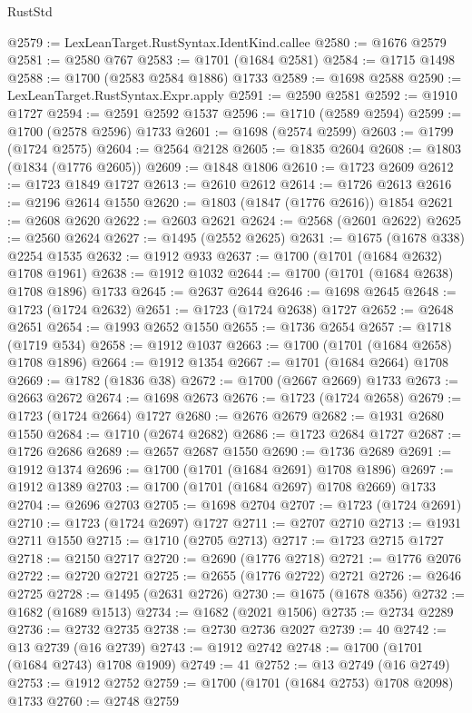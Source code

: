 \begin{lexlean}{RustStd}
\begin{coremodule}
@2579 := LexLeanTarget.RustSyntax.IdentKind.callee
@2580 := @1676 @2579
@2581 := @2580 @767
@2583 := @1701 (@1684 @2581)
@2584 := @1715 @1498
@2588 := @1700 (@2583 @2584 @1886) @1733
@2589 := @1698 @2588
@2590 := LexLeanTarget.RustSyntax.Expr.apply
@2591 := @2590 @2581
@2592 := @1910 @1727
@2594 := @2591 @2592 @1537
@2596 := @1710 (@2589 @2594)
@2599 := @1700 (@2578 @2596) @1733
@2601 := @1698 (@2574 @2599)
@2603 := @1799 (@1724 @2575)
@2604 := @2564 @2128
@2605 := @1835 @2604
@2608 := @1803 (@1834 (@1776 @2605))
@2609 := @1848 @1806
@2610 := @1723 @2609
@2612 := @1723 @1849 @1727
@2613 := @2610 @2612
@2614 := @1726 @2613
@2616 := @2196 @2614 @1550
@2620 := @1803 (@1847 (@1776 @2616)) @1854
@2621 := @2608 @2620
@2622 := @2603 @2621
@2624 := @2568 (@2601 @2622)
@2625 := @2560 @2624
@2627 := @1495 (@2552 @2625)
@2631 := @1675 (@1678 @338) @2254 @1535
@2632 := @1912 @933
@2637 := @1700 (@1701 (@1684 @2632) @1708 @1961)
@2638 := @1912 @1032
@2644 := @1700 (@1701 (@1684 @2638) @1708 @1896) @1733
@2645 := @2637 @2644
@2646 := @1698 @2645
@2648 := @1723 (@1724 @2632)
@2651 := @1723 (@1724 @2638) @1727
@2652 := @2648 @2651
@2654 := @1993 @2652 @1550
@2655 := @1736 @2654
@2657 := @1718 (@1719 @534)
@2658 := @1912 @1037
@2663 := @1700 (@1701 (@1684 @2658) @1708 @1896)
@2664 := @1912 @1354
@2667 := @1701 (@1684 @2664) @1708
@2669 := @1782 (@1836 @38)
@2672 := @1700 (@2667 @2669) @1733
@2673 := @2663 @2672
@2674 := @1698 @2673
@2676 := @1723 (@1724 @2658)
@2679 := @1723 (@1724 @2664) @1727
@2680 := @2676 @2679
@2682 := @1931 @2680 @1550
@2684 := @1710 (@2674 @2682)
@2686 := @1723 @2684 @1727
@2687 := @1726 @2686
@2689 := @2657 @2687 @1550
@2690 := @1736 @2689
@2691 := @1912 @1374
@2696 := @1700 (@1701 (@1684 @2691) @1708 @1896)
@2697 := @1912 @1389
@2703 := @1700 (@1701 (@1684 @2697) @1708 @2669) @1733
@2704 := @2696 @2703
@2705 := @1698 @2704
@2707 := @1723 (@1724 @2691)
@2710 := @1723 (@1724 @2697) @1727
@2711 := @2707 @2710
@2713 := @1931 @2711 @1550
@2715 := @1710 (@2705 @2713)
@2717 := @1723 @2715 @1727
@2718 := @2150 @2717
@2720 := @2690 (@1776 @2718)
@2721 := @1776 @2076
@2722 := @2720 @2721
@2725 := @2655 (@1776 @2722) @2721
@2726 := @2646 @2725
@2728 := @1495 (@2631 @2726)
@2730 := @1675 (@1678 @356)
@2732 := @1682 (@1689 @1513)
@2734 := @1682 (@2021 @1506)
@2735 := @2734 @2289
@2736 := @2732 @2735
@2738 := @2730 @2736 @2027
@2739 := 40
@2742 := @13 @2739 (@16 @2739)
@2743 := @1912 @2742
@2748 := @1700 (@1701 (@1684 @2743) @1708 @1909)
@2749 := 41
@2752 := @13 @2749 (@16 @2749)
@2753 := @1912 @2752
@2759 := @1700 (@1701 (@1684 @2753) @1708 @2098) @1733
@2760 := @2748 @2759

\end{coremodule}
\end{lexlean}
